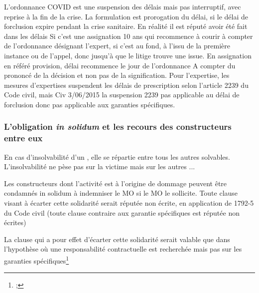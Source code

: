 				L’ordonnance COVID est une suspension des délais mais pas interruptif, avec reprise à la fin de la crise. La formulation est prorogation du délai, si le délai de forclusion expire pendant la crise sanitaire. En réalité il est réputé avoir été fait dans les délais
				Si c’est une assignation 10 ans qui recommence à courir à compter de l’ordonnance désignant l’expert, si c’est au fond, à l’issu de la première instance ou de l’appel, donc jusqu’à que le litige trouve une issue.
				En assignation en référé provision, délai recommence le jour de l’ordonnance
				A compter du prononcé de la décision et non pas de la signification.
				Pour l’expertise, les mesures d’expertises suspendent les délais de prescription selon l’article 2239 du Code civil, mais Civ 3/06/2015 la suspension 2239 pas applicable au délai de forclusion donc pas applicable aux garanties spécifiques.


		\subsubsection{L'obligation \emph{in solidum} et les recours des constructeurs entre eux}

			En cas d'insolvabilité d'un \lo, elle se répartie entre tous les autres \lo solvables. L'insolvabilité ne pèse pas sur la victime mais sur les autres ...

			Les constructeurs dont l’activité est à l’origine de dommage peuvent être condamnés in solidum à indemniser le MO si le MO le sollicite. Toute clause visant à écarter cette solidarité serait réputée non écrite, en application de 1792-5 du Code civil (toute clause contraire aux garantie spécifiques est réputée non écrites)

			La clause qui a pour effet d’écarter cette solidarité serait valable que dans l’hypothèse où une responsabilité contractuelle est recherchée mais pas sur les garanties spécifiques\footnote{ ; }


